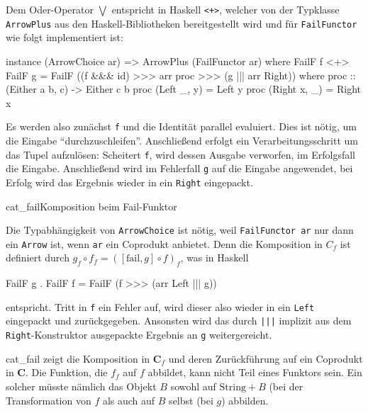 \documentclass[12pt, a4paper, bibgerm]{scrbook}
\newenvironment{DIFnomarkup}{}{}
\newcommand\icode[1]{\lstinline?#1?}
\newcommand\abb{}
\newcommand\fig{}
\begin{document}
Dem Oder-Operator $\bigvee$ entspricht in Haskell \icode{<+>}, welcher
von der Typklasse \icode{ArrowPlus} aus den Haskell-Bibliotheken
bereitgestellt wird und für \icode{FailFunctor} wie folgt implementiert
ist:

\begin{DIFnomarkup}\begin{code}
instance (ArrowChoice ar) => ArrowPlus (FailFunctor ar) where
  FailF f <+> FailF g = FailF ((f &&& id) >>> arr proc >>> (g ||| arr Right))
   where proc :: (Either a b, c) -> Either c b
         proc (Left  _, y) = Left y
         proc (Right x, _) = Right x
\end{code}\end{DIFnomarkup} %

Es werden also zunächst \icode{f} und die Identität parallel
evaluiert. Dies ist nötig, um die Eingabe
"`durchzuschleifen"'. Anschließend erfolgt ein Verarbeitungsschritt um
das Tupel aufzulösen: Scheitert \icode{f}, wird dessen Ausgabe
verworfen, im Erfolgsfall die Eingabe. Anschließend wird im
Fehlerfall \icode{g} auf die Eingabe angewendet, bei Erfolg wird das
Ergebnis wieder in ein \icode{Right} eingepackt.

\fig{cat_fail}{Komposition beim Fail-Funktor}

Die Typabhängigkeit von \icode{ArrowChoice} ist nötig, weil
\icode{FailFunctor ar} nur dann ein \icode{Arrow} ist, wenn \icode{ar}
ein Coprodukt anbietet. Denn die Komposition in $C_{f}$ ist definiert
durch $g_{f} \circ f_{f} = ([\mathrm{fail},g] \circ f)_{f}$, was in Haskell
\begin{DIFnomarkup}\begin{code}
FailF g . FailF f = FailF (f >>> (arr Left ||| g))
\end{code}\end{DIFnomarkup} %
entspricht. Tritt in \icode{f} ein Fehler auf, wird dieser also wieder
in ein \icode{Left} eingepackt und zurückgegeben. Ansonsten wird das
durch \icode{|||} implizit aus dem \icode{Right}-Konstruktor ausgepackte
Ergebnis an \icode{g} weitergereicht.

\abb{cat_fail} zeigt die Komposition in $\mathbf{C}_f$ und deren
Zurückführung auf ein Coprodukt in $\mathbf{C}$. Die Funktion, die $f_f$
auf $f$ abbildet, kann nicht Teil eines Funktors sein. Ein solcher
müsste nämlich das Objekt $B$ sowohl auf $\mathrm{String}+B$ (bei der
Transformation von $f$ als auch auf $B$ selbst (bei $g$) abbilden.
\end{document}
